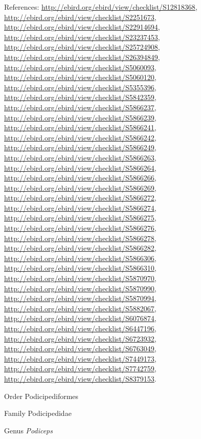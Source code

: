\documentclass[9pt, article]{memoir}
\begin{document}
\begin{multicols}{2}
\vspace{6pt}References: 
\url{http://ebird.org/ebird/view/checklist/S12818368}, 
\url{http://ebird.org/ebird/view/checklist/S2251673}, 
\url{http://ebird.org/ebird/view/checklist/S22914694}, 
\url{http://ebird.org/ebird/view/checklist/S23237453}, 
\url{http://ebird.org/ebird/view/checklist/S25724908}, 
\url{http://ebird.org/ebird/view/checklist/S26394849}, 
\url{http://ebird.org/ebird/view/checklist/S5060093}, 
\url{http://ebird.org/ebird/view/checklist/S5060120}, 
\url{http://ebird.org/ebird/view/checklist/S5355396}, 
\url{http://ebird.org/ebird/view/checklist/S5842359}, 
\url{http://ebird.org/ebird/view/checklist/S5866237}, 
\url{http://ebird.org/ebird/view/checklist/S5866239}, 
\url{http://ebird.org/ebird/view/checklist/S5866241}, 
\url{http://ebird.org/ebird/view/checklist/S5866242}, 
\url{http://ebird.org/ebird/view/checklist/S5866249}, 
\url{http://ebird.org/ebird/view/checklist/S5866263}, 
\url{http://ebird.org/ebird/view/checklist/S5866264}, 
\url{http://ebird.org/ebird/view/checklist/S5866266}, 
\url{http://ebird.org/ebird/view/checklist/S5866269}, 
\url{http://ebird.org/ebird/view/checklist/S5866272}, 
\url{http://ebird.org/ebird/view/checklist/S5866274}, 
\url{http://ebird.org/ebird/view/checklist/S5866275}, 
\url{http://ebird.org/ebird/view/checklist/S5866276}, 
\url{http://ebird.org/ebird/view/checklist/S5866278}, 
\url{http://ebird.org/ebird/view/checklist/S5866282}, 
\url{http://ebird.org/ebird/view/checklist/S5866306}, 
\url{http://ebird.org/ebird/view/checklist/S5866310}, 
\url{http://ebird.org/ebird/view/checklist/S5870970}, 
\url{http://ebird.org/ebird/view/checklist/S5870990}, 
\url{http://ebird.org/ebird/view/checklist/S5870994}, 
\url{http://ebird.org/ebird/view/checklist/S5882067}, 
\url{http://ebird.org/ebird/view/checklist/S6076874}, 
\url{http://ebird.org/ebird/view/checklist/S6447196}, 
\url{http://ebird.org/ebird/view/checklist/S6723932}, 
\url{http://ebird.org/ebird/view/checklist/S6763049}, 
\url{http://ebird.org/ebird/view/checklist/S7449173}, 
\url{http://ebird.org/ebird/view/checklist/S7742759}, 
\url{http://ebird.org/ebird/view/checklist/S8379153}.

\vspace{6pt}\noindent\hspace{18pt}Order Podicipediformes


\vspace{6pt}\noindent\hspace{24pt}Family Podicipedidae


\vspace{6pt}\noindent\hspace{30pt}Genus \textit{Podiceps}



\end{multicols}
\end{document}

